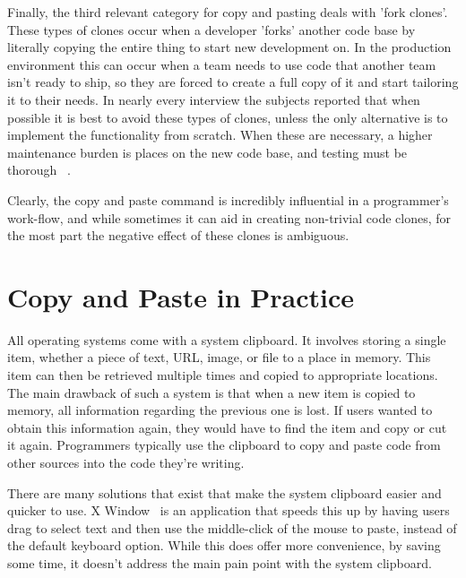 \documentclass{acm_proc_article-sp}
\begin{document}
Finally, the third relevant category for copy and pasting deals with 'fork clones'. These types of clones occur when a developer 'forks' another code base by literally copying the entire thing to start new development on. In the production environment this can occur when a team needs to use code that another team isn't ready to ship, so they are forced to create a full copy of it and start tailoring it to their needs. In nearly every interview the subjects reported that when possible it is best to avoid these types of clones, unless the only alternative is to implement the functionality from scratch. When these are necessary, a higher maintenance burden is places on the new code base, and testing must be thorough ~\cite{devWorkHabits}.

Clearly, the copy and paste command is incredibly influential in a programmer's work-flow, and while sometimes it can aid in creating non-trivial code clones, for the most part the negative effect of these clones is ambiguous. 

\section{Copy and Paste in Practice}\label{Copy}

All operating systems come with a system clipboard. It involves storing a single item, whether a piece of text, URL, image, or file to a place in memory. This item can then be retrieved multiple times and copied to appropriate locations. The main drawback of such a system is that when a new item is copied to memory, all information regarding the previous one is lost. If users wanted to obtain this information again, they would have to find the item and copy or cut it again. Programmers typically use the  clipboard to copy and paste code from other sources into the code they're writing.~\cite{codeReuse}

There are many solutions that exist that make the system clipboard easier and quicker to use. X Window~\cite{overlapWindow} is an application that speeds this up by having users drag to select text and then use the middle-click of the mouse to paste, instead of the default keyboard option. While this does offer more convenience, by saving some time, it doesn't address the main pain point with the system clipboard.
\end{document}
